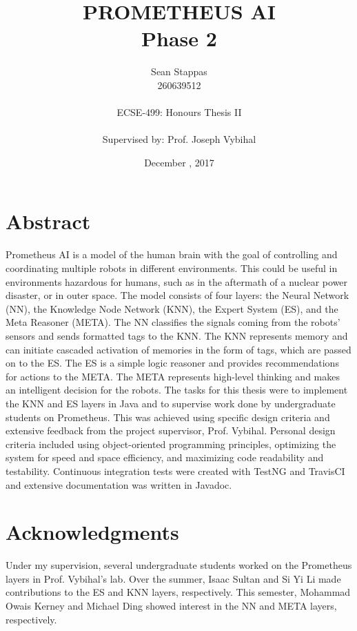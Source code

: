\documentclass[titlepage,11pt]{article}
\title
{
	\uppercase{Prometheus AI} \\
	\large Phase 2
}
\author %
{
	Sean Stappas \\ 
	260639512 \\
	\\ 
	ECSE-499: Honours Thesis II \\
	\\
	\small Supervised by: Prof. Joseph Vybihal
}
\date{December \nth{7}, 2017}
\begin{document}
	
\sloppy

\maketitle

\section*{Abstract}
Prometheus AI is a model of the human brain with the goal of controlling and coordinating multiple robots in different environments. This could be useful in environments hazardous for humans, such as in the aftermath of a nuclear power disaster, or in outer space. The model consists of four layers: the Neural Network (NN), the Knowledge Node Network (KNN), the Expert System (ES), and the Meta Reasoner (META). The NN classifies the signals coming from the robots' sensors and sends formatted tags to the KNN. The KNN represents memory and can initiate cascaded activation of memories in the form of tags, which are passed on to the ES. The ES is a simple logic reasoner and provides recommendations for actions to the META. The META represents high-level thinking and makes an intelligent decision for the robots. The tasks for this thesis were to implement the KNN and ES layers in Java and to supervise work done by undergraduate students on Prometheus. This was achieved using specific design criteria and extensive feedback from the project supervisor, Prof. Vybihal. Personal design criteria included using object-oriented programming principles, optimizing the system for speed and space efficiency, and maximizing code readability and testability. Continuous integration tests were created with TestNG and TravisCI and extensive documentation was written in Javadoc.

\section*{Acknowledgments}
Under my supervision, several undergraduate students worked on the Prometheus layers in Prof. Vybihal's lab. Over the summer, Isaac Sultan and Si Yi Li made contributions to the ES and KNN layers, respectively. This semester, Mohammad Owais Kerney and Michael Ding showed interest in the NN and META layers, respectively.
\end{document}

